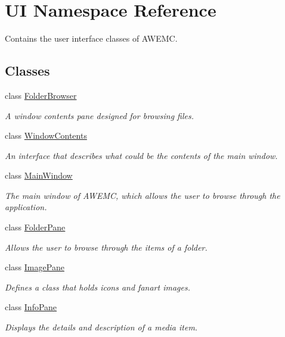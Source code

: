 \hypertarget{namespace_u_i}{\section{U\-I Namespace Reference}
\label{namespace_u_i}
}


Contains the user interface classes of A\-W\-E\-M\-C.  


\subsection*{Classes}
\begin{DoxyCompactItemize}
\item 
class \hyperlink{class_u_i_1_1_folder_browser}{Folder\-Browser}
\begin{DoxyCompactList}\small\item\em A window contents pane designed for browsing files. \end{DoxyCompactList}\item 
class \hyperlink{class_u_i_1_1_window_contents}{Window\-Contents}
\begin{DoxyCompactList}\small\item\em An interface that describes what could be the contents of the main window. \end{DoxyCompactList}\item 
class \hyperlink{class_u_i_1_1_main_window}{Main\-Window}
\begin{DoxyCompactList}\small\item\em The main window of A\-W\-E\-M\-C, which allows the user to browse through the application. \end{DoxyCompactList}\item 
class \hyperlink{class_u_i_1_1_folder_pane}{Folder\-Pane}
\begin{DoxyCompactList}\small\item\em Allows the user to browse through the items of a folder. \end{DoxyCompactList}\item 
class \hyperlink{class_u_i_1_1_image_pane}{Image\-Pane}
\begin{DoxyCompactList}\small\item\em Defines a class that holds icons and fanart images. \end{DoxyCompactList}\item 
class \hyperlink{class_u_i_1_1_info_pane}{Info\-Pane}
\begin{DoxyCompactList}\small\item\em Displays the details and description of a media item. \end{DoxyCompactList}\item 

\end{DoxyCompactItemize}
